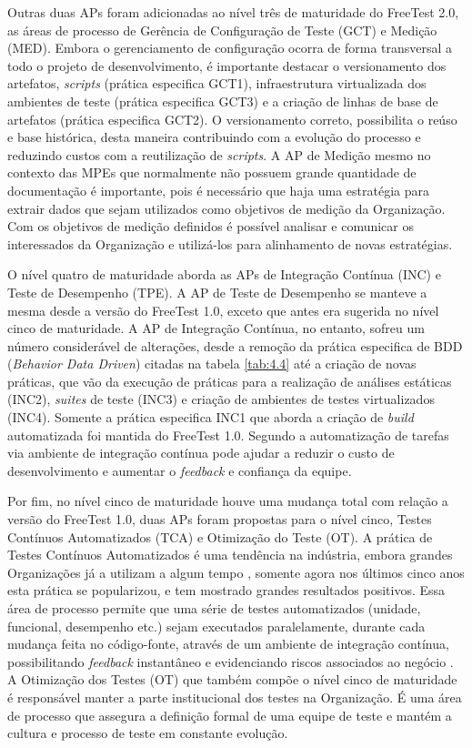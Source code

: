 Outras duas APs foram adicionadas ao nível três de maturidade do FreeTest 2.0, as áreas de processo de Gerência de Configuração de Teste (GCT) e Medição (MED). Embora o gerenciamento de configuração ocorra de forma transversal a todo o projeto de desenvolvimento, é importante destacar o versionamento dos artefatos, \textit{scripts} (prática especifica GCT1), infraestrutura virtualizada dos ambientes de teste (prática especifica GCT3) e a criação de linhas de base de artefatos (prática especifica GCT2). O versionamento correto, possibilita o reúso e base histórica, desta maneira contribuindo com a evolução do processo e reduzindo custos com a reutilização de \textit{scripts}. A AP de Medição mesmo no contexto das MPEs que normalmente não possuem grande quantidade de documentação é importante, pois é necessário que haja uma estratégia para extrair dados que sejam utilizados como objetivos de medição da Organização. Com os objetivos de medição definidos é possível analisar e comunicar os interessados da Organização e utilizá-los para alinhamento de novas estratégias.

O nível quatro de maturidade aborda as APs de Integração Contínua (INC) e Teste de Desempenho (TPE). A AP de Teste de Desempenho se manteve a mesma desde a versão do FreeTest 1.0, exceto que antes era sugerida no nível cinco de maturidade. A AP de Integração Contínua, no entanto, sofreu um número considerável de alterações, desde a remoção da prática especifica de BDD (\textit{Behavior Data Driven}) citadas na tabela \ref{tab:4.4} até a criação de novas práticas, que vão da execução de práticas para a realização de análises estáticas (INC2), \textit{suites} de teste (INC3) e criação de ambientes de testes virtualizados (INC4). Somente a prática especifica INC1 que aborda a criação de \textit{build} automatizada foi mantida do FreeTest 1.0. Segundo \cite{salf2003} a automatização de tarefas via ambiente de integração contínua pode ajudar a reduzir o custo de desenvolvimento e aumentar o \textit{feedback} e confiança da equipe.

Por fim, no nível cinco de maturidade houve uma mudança total com relação a versão do FreeTest 1.0, duas APs foram propostas para o nível cinco, Testes Contínuos Automatizados (TCA) e Otimização do Teste (OT). A prática de Testes Contínuos Automatizados é uma tendência na indústria, embora grandes Organizações já a utilizam a algum tempo \cite{JamesWhittakerJasonCarollo2012}, somente agora nos últimos cinco anos esta prática se popularizou, e tem mostrado grandes resultados positivos. Essa área de processo permite que uma série de testes automatizados (unidade, funcional, desempenho etc.) sejam executados paralelamente, durante cada mudança feita no código-fonte, através de um ambiente de integração contínua, possibilitando \textit{feedback} instantâneo e evidenciando riscos associados ao negócio \cite{BRAGA2015}. A Otimização dos Testes (OT) que também compõe o nível cinco de maturidade é responsável manter a parte institucional dos testes na Organização. É uma área de processo que assegura a definição formal de uma equipe de teste e mantém a cultura e processo de teste em constante evolução.

